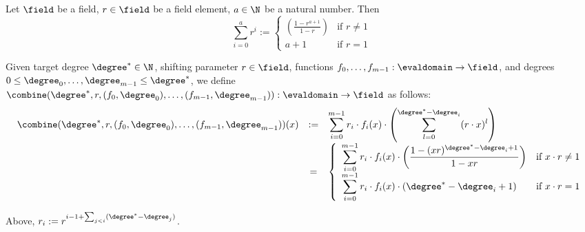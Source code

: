 \begin{lemma}\label{fact:geometric_sum}
    Let $\field$ be a field, $r\in\field$ be a field element, $a\in\N$ be a natural number. Then
    \[
    \sum_{i=0}^{a} r^i :=
    \left\{
    \begin{array}{ll}
        \displaystyle\left(\frac{1 - r^{a+1}}{1 - r}\right)
        & \text{if } r \neq 1 \\[6pt]
        a + 1
        & \text{if } r = 1
    \end{array}
    \right.
    \]

\end{lemma}

\begin{definition}\label{def:combine}
    Given target degree $\degree^*\in\N$, shifting parameter $r\in\field$, functions $f_0,\ldots,f_{m-1}:\evaldomain\rightarrow\field$, and degrees $0\leq \degree_0,\ldots,\degree_{m-1}\leq {\degree}^*$, we define $\combine(\degree^*,r,(f_0,\degree_0),\ldots,(f_{m-1},\degree_{m-1})):\evaldomain\rightarrow\field$ as follows:
        \[
        \begin{array}{rcl}
        \combine(\degree^*, r, (f_0, \degree_0), \ldots, (f_{m-1}, \degree_{m-1}))(x)
        & := & \displaystyle\sum_{i=0}^{m-1} r_i \cdot f_i(x) \cdot \left( \sum_{l=0}^{\degree^* - \degree_i} (r \cdot x)^l \right) \\[10pt]
        & = & \left\{
        \begin{array}{ll}
            \displaystyle\sum_{i=0}^{m-1} r_i \cdot f_i(x) \cdot \left( \dfrac{1 - (x r)^{\degree^* - \degree_i + 1}}{1 - x r} \right)
            & \text{if } x \cdot r \neq 1 \\[8pt]
            \displaystyle\sum_{i=0}^{m-1} r_i \cdot f_i(x) \cdot (\degree^* - \degree_i + 1)
            & \text{if } x \cdot r = 1
        \end{array}
        \right.
        \end{array}
        \]

Above, $r_i:=r^{i-1+\sum_{j<i}(\degree^*-\degree_j)}$.
\end{definition}

